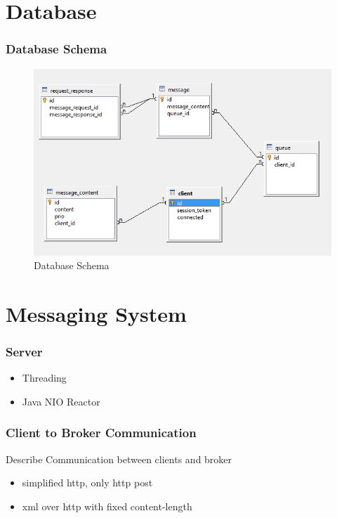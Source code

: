 \documentclass{beamer}
\begin{document}
\section{Database}
\begin{frame}
\frametitle{Database Schema}

\begin{figure}
  \begin{center}
    \includegraphics[scale=0.4]{../../database/db-schema.png}
  \end{center}
  \caption{Database Schema}
  \label{fig:db-schema}
\end{figure}



\end{frame}



\section{Messaging System}
\begin{frame}
\frametitle{Server}
\begin{itemize}
\item Threading
\item Java NIO Reactor
\end{itemize}
\end{frame}

\begin{frame}
\frametitle{Client to Broker Communication}
Describe Communication between clients and broker
\begin{itemize}
\item simplified http, only http post
\item xml over http with fixed content-length
\end{itemize}


\end{frame}
\end{document}
